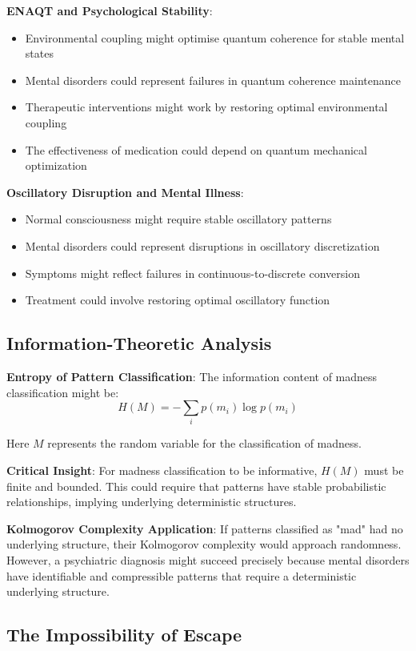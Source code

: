 \documentclass[12pt]{article}
\begin{document}
\textbf{ENAQT and Psychological Stability}:
\begin{itemize}
\item Environmental coupling might optimise quantum coherence for stable mental states
\item Mental disorders could represent failures in quantum coherence maintenance
\item Therapeutic interventions might work by restoring optimal environmental coupling
\item The effectiveness of medication could depend on quantum mechanical optimization
\end{itemize}

\textbf{Oscillatory Disruption and Mental Illness}:
\begin{itemize}
\item Normal consciousness might require stable oscillatory patterns
\item Mental disorders could represent disruptions in oscillatory discretization
\item Symptoms might reflect failures in continuous-to-discrete conversion
\item Treatment could involve restoring optimal oscillatory function
\end{itemize}

\subsection{Information-Theoretic Analysis}

\textbf{Entropy of Pattern Classification}: The information content of madness classification might be:
$$H(M) = -\sum_i p(m_i) \log p(m_i)$$

Here $M$ represents the random variable for the classification of madness.

\textbf{Critical Insight}: For madness classification to be informative, $H(M)$ must be finite and bounded. This could require that patterns have stable probabilistic relationships, implying underlying deterministic structures.

\textbf{Kolmogorov Complexity Application}: If patterns classified as "mad" had no underlying structure, their Kolmogorov complexity would approach randomness. However, a psychiatric diagnosis might succeed precisely because mental disorders have identifiable and compressible patterns that require a deterministic underlying structure.

\subsection{The Impossibility of Escape}
\end{document}
